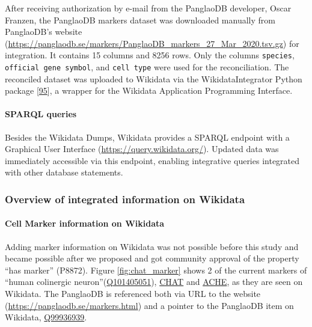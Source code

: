 After receiving authorization by e-mail from the PanglaoDB developer, Oscar Franzen, the PanglaoDB markers dataset was downloaded manually from PanglaoDB's website (\url{https://panglaodb.se/markers/PanglaoDB_markers_27_Mar_2020.tsv.gz}) for integration. It contains 15 columns and 8256 rows. Only the columns \texttt{species}, \texttt{official\ gene\ symbol}, and \texttt{cell\ type} were used for the reconciliation.
The reconciled dataset was uploaded to Wikidata via the WikidataIntegrator Python package {[}\protect\hyperlink{ref-qDI8I4IJ}{95}{]}, a wrapper for the Wikidata Application Programming Interface.

\hypertarget{sparql-queries}{%
\paragraph{SPARQL queries}\label{sparql-queries}}

Besides the Wikidata Dumps, Wikidata provides a SPARQL endpoint with a Graphical User Interface (\url{https://query.wikidata.org/}).
Updated data was immediately accessible via this endpoint, enabling integrative queries integrated with other database statements.

\hypertarget{overview-of-integrated-information-on-wikidata}{%
\subsubsection{Overview of integrated information on Wikidata}\label{overview-of-integrated-information-on-wikidata}}

\hypertarget{cell-marker-information-on-wikidata}{%
\paragraph{Cell Marker information on Wikidata}\label{cell-marker-information-on-wikidata}}

Adding marker information on Wikidata was not possible before this study and became possible after we proposed and got community approval of the property ``has marker'' (P8872).
Figure \ref{fig:chat_marker} shows 2 of the current markers of ``human colinergic neuron''(\href{http://www.wikidata.org/entity/Q101405051}{Q101405051}), \href{http://www.wikidata.org/entity/Q14863671}{CHAT} and \href{http://www.wikidata.org/entity/Q407983}{ACHE}, as they are seen on Wikidata.
The PanglaoDB is referenced both via URL to the website (\url{https://panglaodb.se/markers.html}) and a pointer to the PanglaoDB item on Wikidata, \href{http://www.wikidata.org/entity/Q99936939}{Q99936939}.

